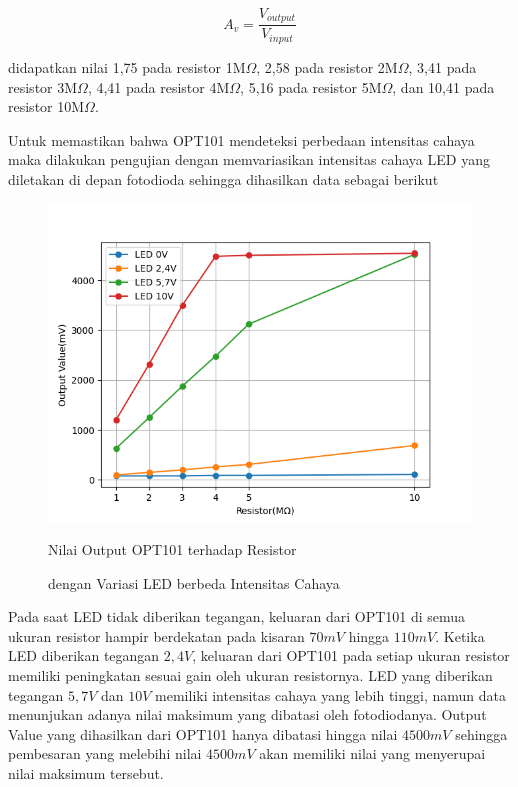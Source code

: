 \begin{equation}
  A_v = \frac{V_{output}}{V_{input}}
\end{equation}

didapatkan nilai 1,75 pada resistor 1M${\Omega}$, 2,58 pada
resistor 2M${\Omega}$, 3,41 pada resistor 3M${\Omega}$, 4,41
pada resistor 4M${\Omega}$, 5,16 pada resistor 5M${\Omega}$,
dan 10,41 pada resistor 10M${\Omega}$.

Untuk memastikan bahwa OPT101 mendeteksi perbedaan intensitas
cahaya maka dilakukan pengujian dengan memvariasikan intensitas
cahaya LED yang diletakan di depan fotodioda sehingga dihasilkan
data sebagai berikut

\begin{figure}[H]
  \centering
  \includegraphics[width=13cm]{Images/GainWLED2.png}
  \caption{Nilai Output OPT101 terhadap Resistor}
  \caption*{dengan Variasi LED berbeda Intensitas Cahaya}
  \label{fig:gain_led}
\end{figure}

Pada saat LED tidak diberikan tegangan, keluaran dari OPT101 di
semua ukuran resistor hampir berdekatan pada kisaran ${70mV}$
hingga ${110mV}$. Ketika LED diberikan tegangan ${2,4V}$,
keluaran dari OPT101 pada setiap ukuran resistor memiliki
peningkatan sesuai gain oleh ukuran resistornya. LED yang
diberikan tegangan ${5,7V}$ dan ${10V}$ memiliki intensitas
cahaya yang lebih tinggi, namun data menunjukan adanya nilai
maksimum yang dibatasi oleh fotodiodanya. Output Value yang
dihasilkan dari OPT101 hanya dibatasi hingga nilai ${4500mV}$
sehingga pembesaran yang melebihi nilai ${4500mV}$ akan memiliki
nilai yang menyerupai nilai maksimum tersebut.


